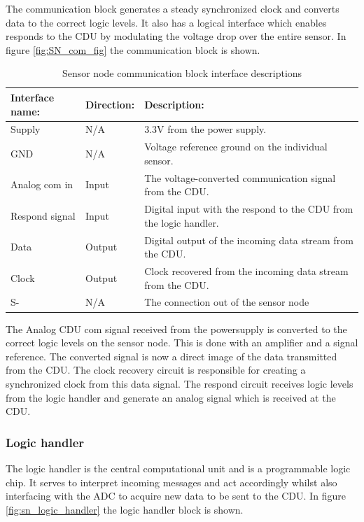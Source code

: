 The communication block generates a steady synchronized clock and converts data to the correct logic levels. It also has a logical interface which enables responds to the CDU by modulating the voltage drop over the entire sensor. In figure \ref{fig:SN_com_fig} the communication block is shown.

\begin{table}[H]
	\centering
	\begin{tabular}{|p{3cm} |p{2cm} | p{8cm}| }
		\hline
		Interface name:	& Direction: 		& Description: \\ \hline
		Supply			& N/A				& 3.3V from the power supply. \\ \hline
		GND				& N/A				& Voltage reference ground on the individual sensor.\\\hline 
		Analog com in	& Input				& The voltage-converted communication signal from the CDU.\\ \hline
		Respond signal  & Input				& Digital input with the respond to the CDU from the logic handler. \\ \hline
		Data			& Output			& Digital output of the incoming data stream from the CDU.\\ \hline
		Clock			& Output			& Clock recovered from the incoming data stream from the CDU. \\ \hline
		S-				& N/A				& The connection out of the sensor node\\ \hline
	\end{tabular}
	\caption{Sensor node communication block interface descriptions}
\end{table}

The Analog CDU com signal received from the powersupply is converted to the correct logic levels on the sensor node. This is done with an amplifier and a signal reference. The converted signal is now a direct image of the data transmitted from the CDU. The clock recovery circuit is responsible for creating a synchronized clock from this data signal. The respond circuit receives logic levels from the logic handler and generate an analog signal which is received at the CDU.

\subsubsection{Logic handler}
The logic handler is the central computational unit and is a programmable logic chip. It serves to interpret incoming messages and act accordingly whilst also interfacing with the ADC to acquire new data to be sent to the CDU. In figure \ref{fig:sn_logic_handler} the logic handler block is shown.

